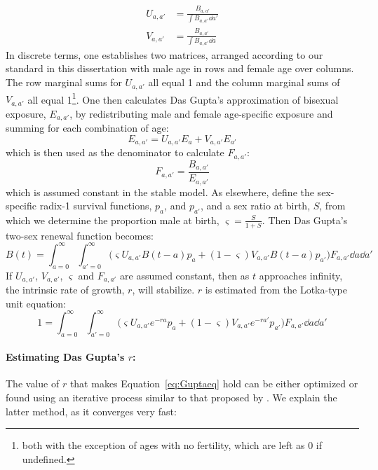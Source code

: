\begin{align}
U_{a,a'} &= \frac{B_{a,a'}}{\int B_{a,a'} \dd a'}\\
V_{a,a'} &= \frac{B_{a,a'}}{\int B_{a,a'} \dd a}
\end{align}
In discrete terms, one establishes two matrices, arranged according to our
standard in this dissertation with male age in rows and female age over columns.
The row marginal sums for $U_{a,a'}$ all equal 1 and the column marginal sums of
$V_{a,a'}$ all equal 1\footnote{both with the exception of ages with no
fertility, which are left as 0 if undefined.}. One then calculates Das Gupta's
approximation of bisexual exposure, $E_{a,a'}$, by redistributing male and
female age-specific exposure and summing for each combination of age:
\begin{equation}
E_{a,a'} = U_{a,a'}E_a + V_{a,a'}E_{a'}
\end{equation}
which is then used as the denominator to calculate $F_{a,a'}$:
\begin{equation}
F_{a,a'} = \frac{B_{a,a'}}{E_{a,a'}}
\end{equation}
which is assumed constant in the stable model. As elsewhere, define the
sex-specific radix-1 survival functions, $p_a$, and $p_{a'}$, and a sex ratio
at birth, $S$, from which we determine the proportion male at
birth, $\varsigma=\frac{S}{1+S}$. Then Das Gupta's two-sex renewal
function becomes:
\begin{equation}
B(t) = \int_{a=0}^\infty \int_{a'=0}^\infty \Big( \varsigma U_{a,a'} B(t-a) p_a
+ (1-\varsigma)V_{a,a'}B(t-a) p_{a'}\Big)F_{a,a'} \dd a \dd a'
\end{equation}
If $U_{a,a'}$, $V_{a,a'}$, $\varsigma$ and $F_{a,a'}$ are assumed constant, then
as $t$ approaches infinity, the intrinsic rate of growth, $r$, will stabilize.
$r$ is estimated from the Lotka-type unit equation:
\begin{equation}
\label{eq:Guptaeq}
1 = \int_{a=0}^\infty \int_{a'=0}^\infty \Big( \varsigma U_{a,a'} e^{-ra} p_a
+ (1-\varsigma)V_{a,a'}e^{-ra'} p_{a'}\Big)F_{a,a'} \dd a \dd a'
\end{equation}
\paragraph{Estimating Das Gupta's $r$: } The value of $r$ that makes
Equation~\eqref{eq:Guptaeq} hold can be either optimized or found using an iterative 
process similar to that proposed by \citet{coale1957new}. We explain the latter method, as it
converges very fast:

